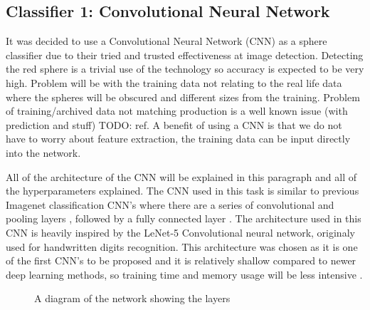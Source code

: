 \documentclass{article}
\begin{document}
\subsection{Classifier 1: Convolutional Neural Network}

It was decided to use a Convolutional Neural Network (CNN) as a sphere classifier due to their tried and trusted effectiveness at image detection.
Detecting the red sphere is a trivial use of the technology so accuracy is expected to be very high.
Problem will be with the training data not relating to the real life data where the spheres will be obscured and different sizes from the training.
Problem of training/archived data not matching production is a well known issue (with prediction and stuff) TODO: ref.
A benefit of using a CNN is that we do not have to worry about feature extraction, the training data can be input directly into the network.

All of the architecture of the CNN will be explained in this paragraph and all of the hyperparameters explained.
The CNN used in this task is similar to previous Imagenet classification CNN's where there are a series of convolutional and pooling layers
, followed by a fully connected layer \cite{krizhevsky2012imagenet}. 
The architecture used in this CNN is heavily inspired by the LeNet-5 Convolutional neural network, originaly used for handwritten digits recognition.
This architecture was chosen as it is one of the first CNN's to be proposed and it is relatively shallow compared to newer deep learning methods, so training time and memory usage will be less intensive \cite{lecun1998gradient}. 

\begin{figure}[ht]
    \noindent{}
    \caption{A diagram of the network showing the layers \cite{LeNail2019}}
    \label{fig:diagram}
\end{figure}
\end{document}
